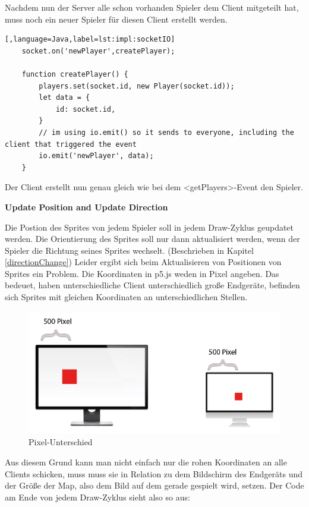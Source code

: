 Nachdem nun der Server alle schon vorhanden Spieler dem Client mitgeteilt hat, muss noch ein neuer Spieler für diesen Client erstellt werden. 

\begin{lstlisting}[,language=Java,label=lst:impl:socketIO]
    socket.on('newPlayer',createPlayer);  

    function createPlayer() {
        players.set(socket.id, new Player(socket.id));
        let data = {
            id: socket.id,
        }
        // im using io.emit() so it sends to everyone, including the client that triggered the event
        io.emit('newPlayer', data);
    }
\end{lstlisting}

Der Client erstellt nun genau gleich wie bei dem <getPlayers>-Event den Spieler.

\textbf{Update Position and Update Direction}

Die Postion des Sprites von jedem Spieler soll in jedem Draw-Zyklus geupdatet werden. Die Orientierung des Sprites soll nur dann aktualisiert werden, wenn der Spieler die Richtung seines Sprites wechselt. (Beschrieben in Kapitel \ref{directionChange})
Leider ergibt sich beim Aktualisieren von Positionen von Sprites ein Problem. Die Koordinaten in p5.js weden in Pixel angeben. Das bedeuet, haben unterschiedliche Client unterschiedlich große Endgeräte, befinden sich Sprites mit gleichen Koordinaten an unterschiedlichen Stellen. 

\begin{figure}[H]
    \centering
    \includegraphics[scale=1]{pics/pixelDiff.PNG}
    \caption{Pixel-Unterschied}
\end{figure}

Aus diesem Grund kann man nicht einfach nur die rohen Koordinaten an alle Clients schicken, muss muss sie in Relation zu dem Bildschirm des Endgeräts und der Größe der Map, also dem Bild auf dem gerade gespielt wird, setzen.
Der Code am Ende von jedem Draw-Zyklus sieht also so aus:

